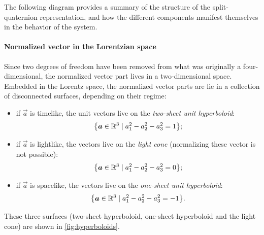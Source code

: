 The following diagram provides a summary of the structure of the split-quaternion representation, and how the different components manifest themselves in the behavior of the system. 
\begin{center}
\end{center}

\paragraph{Normalized vector in the Lorentzian space} Since two degrees of freedom have been removed from what was originally a four-dimensional, the normalized vector part lives in a two-dimensional space. Embedded in the Lorentz space, the normalized vector parts are lie in a collection of disconnected surfaces, depending on their regime:
\begin{itemize}
    \item if $\vec{a}$ is timelike, the unit vectors live on the \emph{two-sheet unit hyperboloid}:
        $$ \qty{\vec{a} \in \real^3 \mid a_1^2 - a_2^2 - a_3^2 = 1};$$
    \item if $\vec{a}$ is lightlike, the vectors live on the \emph{light cone} (normalizing these vector is not possible):
        $$ \qty{\vec{a} \in \real^3 \mid a_1^2 - a_2^2 - a_3^2 = 0}; $$
    \item if $\vec{a}$ is spacelike, the vectors live on the \emph{one-sheet unit hyperboloid}:
        $$ \qty{\vec{a} \in \real^3 \mid a_1^2 - a_2^2 - a_3^2 = -1}. $$
\end{itemize}
These three surfaces (two-sheet hyperboloid, one-sheet hyperboloid and the light cone) are shown in \cref{fig:hyperboloids}. 


